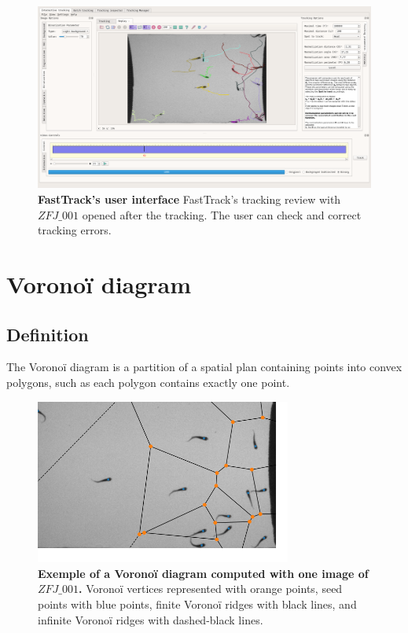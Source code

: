 \begin{appendices}
        \begin{figure}[h!]
        \centering
        \includegraphics[width=1\textwidth]{part_1/assets/ft_preview_2.png}
        \caption{\textbf{FastTrack's user interface} FastTrack's tracking review with $ZFJ\_001$ opened after the tracking. The user can check and correct tracking errors.}
        \end{figure}


    \chapter{Voronoï diagram}
        \label{appendix_voronoi}
        \section{Definition}
        The Voronoï diagram is a partition of a spatial plan containing points into convex polygons, such as each polygon contains exactly one point.

        \begin{figure}[h!]
        \centering
        \includegraphics[width=0.75\textwidth]{part_1/assets/Appendix_voronoi.png}
        \caption{{\bf Exemple of a Voronoï diagram computed with one image of $ZFJ\_001$.} Voronoï vertices represented with orange points, seed points with blue points, finite Voronoï ridges with black lines, and infinite Voronoï ridges with dashed-black lines.}
        \end{figure}


\end{appendices}
